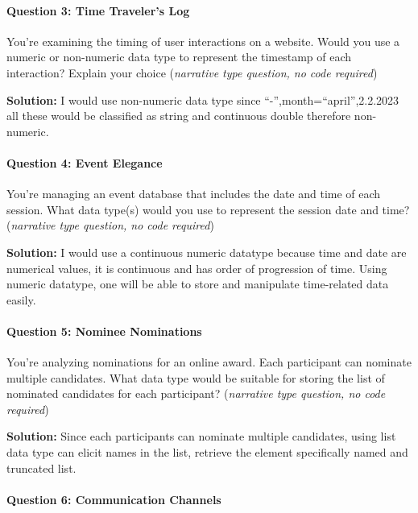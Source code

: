 \documentclass[
]{article}
\begin{document}
\hypertarget{question-3-time-travelers-log}{%
\paragraph{Question 3: Time Traveler's
Log}\label{question-3-time-travelers-log}}

You're examining the timing of user interactions on a website. Would you
use a numeric or non-numeric data type to represent the timestamp of
each interaction? Explain your choice (\emph{narrative type question, no
code required})

\textbf{Solution:} I would use non-numeric data type since
``-'',month=``april'',2.2.2023 all these would be classified as string
and continuous double therefore non-numeric.

\hypertarget{question-4-event-elegance}{%
\paragraph{Question 4: Event Elegance}\label{question-4-event-elegance}}

You're managing an event database that includes the date and time of
each session. What data type(s) would you use to represent the session
date and time? (\emph{narrative type question, no code required})

\textbf{Solution:} I would use a continuous numeric datatype because
time and date are numerical values, it is continuous and has order of
progression of time. Using numeric datatype, one will be able to store
and manipulate time-related data easily.

\hypertarget{question-5-nominee-nominations}{%
\paragraph{Question 5: Nominee
Nominations}\label{question-5-nominee-nominations}}

You're analyzing nominations for an online award. Each participant can
nominate multiple candidates. What data type would be suitable for
storing the list of nominated candidates for each participant?
(\emph{narrative type question, no code required})

\textbf{Solution:} Since each participants can nominate multiple
candidates, using list data type can elicit names in the list, retrieve
the element specifically named and truncated list.

\hypertarget{question-6-communication-channels}{%
\paragraph{Question 6: Communication
Channels}\label{question-6-communication-channels}}
\end{document}

